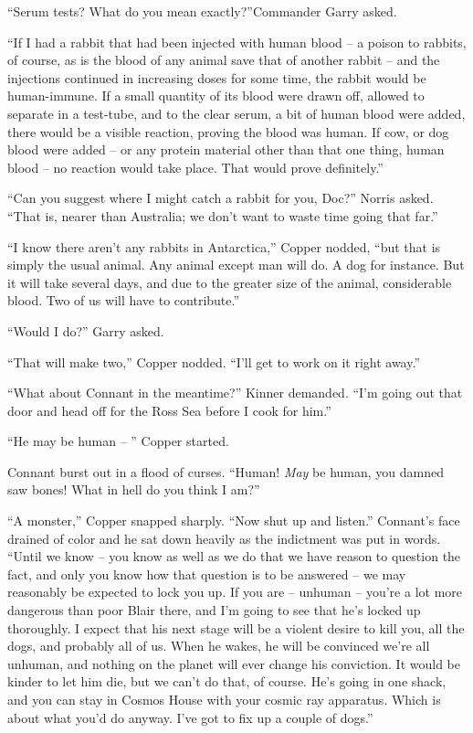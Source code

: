 \documentclass[ebook,oneside,11pt]{memoir}				%
\begin{document}
``Serum tests? What do you mean exactly?''Commander Garry asked.

``If I had a rabbit that had been injected with human blood -- a poison to rabbits, of course, as is the blood of any animal save that of another rabbit -- and the injections continued in increasing doses for some time, the rabbit would be human-immune. If a small quantity of its blood were drawn off, allowed to separate in a test-tube, and to the clear serum, a bit of human blood were added, there would be a visible reaction, proving the blood was human. If cow, or dog blood were added -- or any protein material other than that one thing, human blood -- no reaction would take place. That would prove definitely.''

``Can you suggest where I might catch a rabbit for you, Doc?'' Norris asked. ``That is, nearer than Australia; we don't want to waste time going that far.''

``I know there aren't any rabbits in Antarctica,'' Copper nodded, ``but that is simply the usual animal. Any animal except man will do. A dog for instance. But it will take several days, and due to the greater size of the animal, considerable blood. Two of us will have to contribute.''

``Would I do?'' Garry asked.

``That will make two,'' Copper nodded. ``I'll get to work on it right away.''

``What about Connant in the meantime?'' Kinner demanded. ``I'm going out that door and head off for the Ross Sea before I cook for him.''

``He may be human -- '' Copper started.

Connant burst out in a flood of curses. ``Human! \emph{May} be human, you damned saw bones! What in hell do you think I am?''

``A monster,'' Copper snapped sharply. ``Now shut up and listen.'' Connant's face drained of color and he sat down heavily as the indictment was put in words. ``Until we know -- you know as well as we do that we have reason to question the fact, and only you know how that question is to be answered -- we may reasonably be expected to lock you up. If you are -- unhuman -- you're a lot more dangerous than poor Blair there, and I'm going to see that he's locked up thoroughly. I expect that his next stage will be a violent desire to kill you, all the dogs, and probably all of us. When he wakes, he will be convinced we're all unhuman, and nothing on the planet will ever change his conviction. It would be kinder to let him die, but we can't do that, of course. He's going in one shack, and you can stay in Cosmos House with your cosmic ray apparatus. Which is about what you'd do anyway. I've got to fix up a couple of dogs.''
\end{document}
